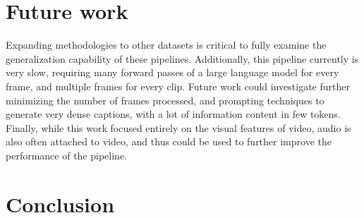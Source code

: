 \documentclass{article}
\begin{document}
\section{Future work}

Expanding methodologies to other datasets is critical to fully examine the generalization capability of these pipelines.
Additionally, this pipeline currently is very slow, requiring many forward passes of a large language model for every frame, and multiple frames for every clip.
Future work could investigate further minimizing the number of frames processed, and prompting techniques to generate very dense captions, with a lot of information content in few tokens.
Finally, while this work focused entirely on the visual features of video, audio is also often attached to video, and thus could be used to further improve the performance of the pipeline.

\section{Conclusion}



\end{document}
